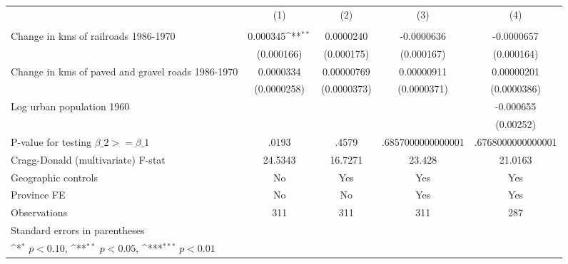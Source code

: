 {
\def\sym#1{\ifmmode^{#1}\else\(^{#1}\)\fi}
\begin{tabular}{l*{4}{c}}
\hline\hline
                &\multicolumn{1}{c}{(1)}&\multicolumn{1}{c}{(2)}&\multicolumn{1}{c}{(3)}&\multicolumn{1}{c}{(4)}\\
                &\multicolumn{1}{c}{}&\multicolumn{1}{c}{}&\multicolumn{1}{c}{}&\multicolumn{1}{c}{}\\
\hline
Change in kms of railroads 1986-1970& 0.000345\sym{**} &0.0000240         &-0.0000636         &-0.0000657         \\
                &(0.000166)         &(0.000175)         &(0.000167)         &(0.000164)         \\
[1em]
Change in kms of paved and gravel roads 1986-1970&0.0000334         &0.00000769         &0.00000911         &0.00000201         \\
                &(0.0000258)         &(0.0000373)         &(0.0000371)         &(0.0000386)         \\
[1em]
Log urban population 1960&                  &                  &                  &-0.000655         \\
                &                  &                  &                  &(0.00252)         \\
\hline
P-value for testing $\beta\_{2} >= \beta\_{1}$&    .0193         &    .4579         &.6857000000000001         &.6768000000000001         \\
Cragg-Donald (multivariate) F-stat&  24.5343         &  16.7271         &   23.428         &  21.0163         \\
Geographic controls&       No         &      Yes         &      Yes         &      Yes         \\
Province FE     &       No         &       No         &      Yes         &      Yes         \\
Observations    &      311         &      311         &      311         &      287         \\
\hline\hline
\multicolumn{5}{l}{\footnotesize Standard errors in parentheses}\\
\multicolumn{5}{l}{\footnotesize \sym{*} \(p<0.10\), \sym{**} \(p<0.05\), \sym{***} \(p<0.01\)}\\
\end{tabular}
}
